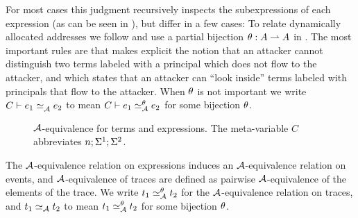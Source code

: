 For most cases this judgment recursively inspects the subexpressions of each expression (as can be seen in ), but differ in a few cases: To relate dynamically allocated addresses we follow \cite{Banerjee:2002:SIF:794201.795164} and use a partial bijection $\theta: A \rightharpoonup A$ in . The most important rules are  that makes explicit the notion that an attacker cannot distinguish two terms labeled with a principal which does not flow to the attacker, and  which states that an attacker can ``look inside'' terms labeled with principals that flow to the attacker. When $\theta$ is not important we write $\loweq{C}{\Attacker}{\expr_1}{\expr_2}$ to mean $\loweq{C}{\Attacker}[\bijection]{\expr_1}{\expr_2}$ for some bijection $\theta$.

\begin{figure}
    \centering
    \caption{$\mathcal{A}$-equivalence for terms and expressions. The meta-variable $C$ abbreviates $n; \Sigma^1; \Sigma^2$.}
    \label{fig:low-eq-expr}
\end{figure}

The $\mathcal{A}$-equivalence relation on expressions induces an $\mathcal{A}$-equivalence relation on events, and $\mathcal{A}$-equivalence of traces are defined as pairwise $\mathcal{A}$-equivalence of the elements of the trace. We write $t_1 \simeq_{\mathcal{A}}^{\theta} t_2$ for the $\mathcal{A}$-equivalence relation on traces, and $t_1 \simeq_{\mathcal{A}} t_2$ to mean $t_1 \simeq_{\mathcal{A}}^{\theta} t_2$ for some bijection $\theta$.

